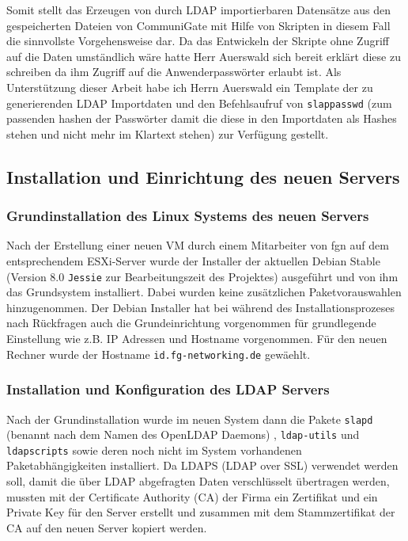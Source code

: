 \documentclass[11pt,a4paper,titlepage=firstiscover,headsepline]{scrartcl} %
\begin{document}
Somit stellt das Erzeugen von durch LDAP importierbaren Datensätze aus den gespeicherten Dateien von CommuniGate mit Hilfe von Skripten in diesem Fall die sinnvollste Vorgehensweise dar. Da das Entwickeln der Skripte ohne Zugriff auf die Daten umständlich wäre hatte Herr Auerswald sich bereit erklärt diese zu schreiben da ihm Zugriff auf die Anwenderpasswörter erlaubt ist. Als Unterstützung dieser Arbeit habe ich Herrn Auerswald ein Template der zu generierenden LDAP Importdaten und den Befehlsaufruf von \texttt{slappasswd} (zum passenden hashen der Passwörter damit die diese in den Importdaten als Hashes stehen und nicht mehr im Klartext stehen) zur Verfügung gestellt.

\subsection{Installation und Einrichtung des neuen Servers}
\subsubsection{Grundinstallation des Linux Systems des neuen Servers}
Nach der Erstellung einer neuen VM durch einem Mitarbeiter von fgn auf dem entsprechendem ESXi-Server wurde der Installer der aktuellen Debian Stable (Version 8.0 \texttt{Jessie} zur Bearbeitungszeit des Projektes) ausgeführt und von ihm das Grundsystem installiert. Dabei wurden keine zusätzlichen Paketvorauswahlen hinzugenommen.  Der Debian Installer hat bei während des Installationsprozeses nach Rückfragen auch die Grundeinrichtung vorgenommen für grundlegende Einstellung wie z.B. IP Adressen und Hostname vorgenommen. Für den neuen Rechner wurde der Hostname \texttt{id.fg-networking.de} gewäehlt.

\subsubsection{Installation und Konfiguration des LDAP Servers}
Nach der Grundinstallation wurde im neuen System dann die Pakete \texttt{slapd} (benannt nach dem Namen des OpenLDAP Daemons) , \texttt{ldap-utils} und \texttt{ldapscripts} sowie deren noch nicht im System vorhandenen Paketabhängigkeiten installiert. Da LDAPS (LDAP over SSL) verwendet werden soll, damit die über LDAP abgefragten Daten verschlüsselt übertragen werden, mussten mit der Certificate Authority (CA) der Firma ein Zertifikat und ein Private Key für den Server erstellt und zusammen mit dem Stammzertifikat der CA auf den neuen Server kopiert werden.
\end{document}
